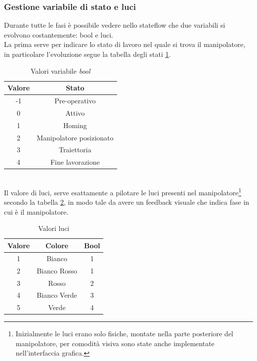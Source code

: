 \subsubsection*{Gestione variabile di stato e luci}
Durante tutte le fasi è possibile vedere nello stateflow che due variabili si evolvono costantemente: bool e luci.
\\La prima serve per indicare lo stato di lavoro nel quale si trova il manipolatore, in particolare l'evoluzione segue la tabella degli stati \ref{table:3}.
\begin{table}[h!]
\centering
\begin{tabular}{|c |c |} 
 \hline
 Valore & Stato \\ [0.5ex] 
 \hline\hline
  -1  & Pre-operativo \\ 
  0  & Attivo \\
  1 & Homing \\
  2 & Manipolatore posizionato\\
  3 & Traiettoria\\
  4 & Fine lavorazione \\
 \hline
\end{tabular}
\caption{Valori variabile \textit{bool}}
\label{table:3}
\end{table}
\\Il valore di luci, serve esattamente a pilotare le luci presenti nel manipolatore\footnote{Inizialmente le luci erano solo fisiche, montate nella parte posteriore del manipolatore, per comodità visiva sono state anche implementate nell'interfaccia grafica.}  secondo la tabella \ref{table:luci}, in modo tale da avere un feedback visuale che indica fase in cui è il manipolatore.
\begin{table}[h!]
\centering
\begin{tabular}{|c |c|c|} 
 \hline
 Valore & Colore & Bool \\ [0.5ex] 
 \hline\hline
  1  & Bianco & 1 \\ 
  2 &  Bianco Rosso & 1\\
  3 &  Rosso & 2 \\
  4 & Bianco Verde & 3\\
  5 & Verde & 4\\
 \hline
\end{tabular}
\caption{Valori luci}
\label{table:luci}
\end{table}

